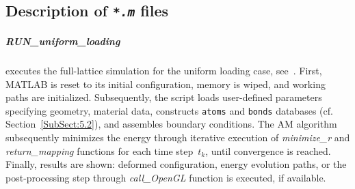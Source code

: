 \documentclass[preprint,12pt,authoryear]{elsarticle}
\begin{document}
\subsection{Description of \texttt{\emph{*.m}} files}
\label{SubSect:5.1}
%
%
\subparagraph{RUN\_uniform\_loading} executes the full-lattice simulation for the uniform loading case, see~\cite[Section~5.1]{RokosQC}. First, MATLAB is reset to its initial configuration, memory is wiped, and working paths are initialized. Subsequently, the script loads user-defined parameters specifying geometry, material data, constructs \texttt{atoms} and \texttt{bonds} databases (cf. Section~\ref{SubSect:5.2}), and assembles boundary conditions. The AM algorithm subsequently minimizes the energy through iterative execution of \emph{minimize\_r} and \emph{return\_mapping} functions for each time step~$t_k$, until convergence is reached. Finally, results are shown: deformed configuration, energy evolution paths, or the post-processing step through \emph{call\_OpenGL} function is executed, if available.
\end{document}
